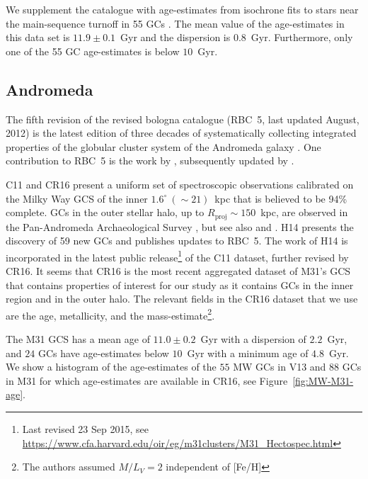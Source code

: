 \documentclass[a4paper,fleqn,usenatbib]{mnras}
\begin{document}
We supplement the catalogue with age-estimates from isochrone fits to stars
near the main-sequence turnoff in 55 GCs \citep[][hereafter V13]{2013ApJ...775..134V}.
The mean value of the age-estimates in this data set is $11.9 \pm 0.1$~Gyr and
the dispersion is $0.8$~Gyr. Furthermore, only one of the 55 GC age-estimates is
below $10$~Gyr.

\subsection{Andromeda}
\label{sec:andromeda}
The fifth revision of the revised bologna catalogue (RBC~5, last updated
August, 2012) is the latest edition of three decades of systematically
collecting integrated properties of the globular cluster system of the
Andromeda galaxy \citep[][and references therein]{2004A&A...416..917G}. One
contribution to RBC~5 is the work by \citet[][hereafter C11]{2011AJ....141...61C},
subsequently updated by \citet[][hereafter CR16]{2016ApJ...824...42C}.

C11 and CR16 present a uniform set of spectroscopic observations calibrated
on the Milky Way GCS of the inner $1.6^\circ~(\sim21)$~kpc that
is believed to be 94\% complete. GCs in the outer stellar halo, up to
$R_{\text{proj}}\sim150$~kpc, are observed in the Pan-Andromeda Archaeological
Survey \citep[PAndAS, ][hereafter H14]{2014MNRAS.442.2165H}, but see also
\citet{2014MNRAS.442.2929V} and \citet{2019MNRAS.484.1756M}. H14 presents the
discovery of 59 new GCs and publishes updates to RBC~5. The work of H14 is
incorporated in the latest public release\footnote{Last revised 23 Sep 2015, see
\url{https://www.cfa.harvard.edu/oir/eg/m31clusters/M31_Hectospec.html}}
of the C11 dataset, further revised by CR16. It seems that CR16 is the most
recent aggregated dataset of M31's GCS that contains properties of interest
for our study as it contains GCs in the inner region and in the outer halo. The
relevant fields in the CR16 dataset that we use are the age, metallicity, and the
mass-estimate\footnote{The authors assumed $M/L_V = 2$ independent of [Fe/H]}.

The M31 GCS has a mean age of $11.0 \pm 0.2$~Gyr with a dispersion of $2.2$~Gyr,
and $24$ GCs have age-estimates below $10$~Gyr with a minimum age of $4.8$~Gyr.
We show a histogram of the age-estimates of the $55$ MW GCs in V13 and $88$ GCs
in M31 for which age-estimates are available in CR16, see Figure~\ref{fig:MW-M31-age}.
\end{document}

